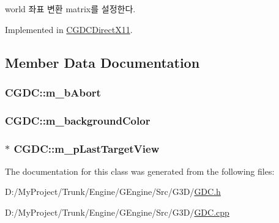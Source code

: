 \begin{DoxyItemize}
\item world 좌표 변환 matrix를 설정한다. 
\end{DoxyItemize}

Implemented in \hyperlink{class_c_g_d_c_direct_x11_af04aa6feaebc83850d7dbb49ca44dd7f}{C\+G\+D\+C\+Direct\+X11}.



\subsection{Member Data Documentation}
\hypertarget{class_c_g_d_c_a84a2e179021ffb26c80ac82f3430e5e7}{}
\subsubsection[{m\+\_\+b\+Abort}]{ C\+G\+D\+C\+::m\+\_\+b\+Abort\hspace{0.3cm}{\ttfamily [protected]}}\label{class_c_g_d_c_a84a2e179021ffb26c80ac82f3430e5e7}
\hypertarget{class_c_g_d_c_ab4c69c7cd04f20ffa3969ed64b11d8f3}{}
\subsubsection[{m\+\_\+background\+Color}]{ C\+G\+D\+C\+::m\+\_\+background\+Color\hspace{0.3cm}{\ttfamily [protected]}}\label{class_c_g_d_c_ab4c69c7cd04f20ffa3969ed64b11d8f3}
\hypertarget{class_c_g_d_c_afe672e18142fcbd92713e843bd13fcd1}{}
\subsubsection[{m\+\_\+p\+Last\+Target\+View}]{$\ast$ C\+G\+D\+C\+::m\+\_\+p\+Last\+Target\+View\hspace{0.3cm}{\ttfamily [protected]}}\label{class_c_g_d_c_afe672e18142fcbd92713e843bd13fcd1}


The documentation for this class was generated from the following files\+:\begin{DoxyCompactItemize}
\item 
D\+:/\+My\+Project/\+Trunk/\+Engine/\+G\+Engine/\+Src/\+G3\+D/\hyperlink{_g_d_c_8h}{G\+D\+C.\+h}\item 
D\+:/\+My\+Project/\+Trunk/\+Engine/\+G\+Engine/\+Src/\+G3\+D/\hyperlink{_g_d_c_8cpp}{G\+D\+C.\+cpp}\end{DoxyCompactItemize}
